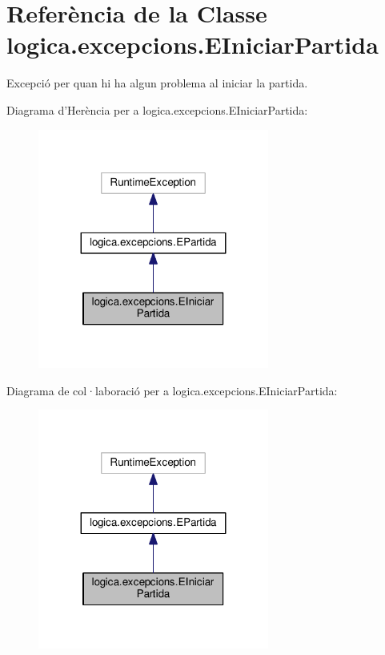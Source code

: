 \hypertarget{classlogica_1_1excepcions_1_1_e_iniciar_partida}{\section{Referència de la Classe logica.\+excepcions.\+E\+Iniciar\+Partida}
\label{classlogica_1_1excepcions_1_1_e_iniciar_partida}
}


Excepció per quan hi ha algun problema al iniciar la partida.  




Diagrama d'Herència per a logica.\+excepcions.\+E\+Iniciar\+Partida\+:
\nopagebreak
\begin{figure}[H]
\begin{center}
\leavevmode
\includegraphics[width=215pt]{classlogica_1_1excepcions_1_1_e_iniciar_partida__inherit__graph}
\end{center}
\end{figure}


Diagrama de col·laboració per a logica.\+excepcions.\+E\+Iniciar\+Partida\+:
\nopagebreak
\begin{figure}[H]
\begin{center}
\leavevmode
\includegraphics[width=215pt]{classlogica_1_1excepcions_1_1_e_iniciar_partida__coll__graph}
\end{center}
\end{figure}
